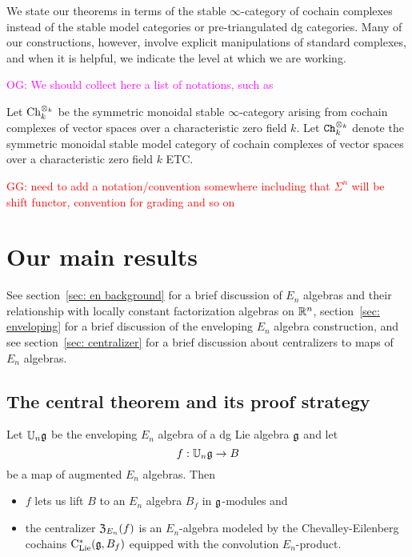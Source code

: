 \documentclass[11pt]{amsart}
\numberwithin{equation}{section}
\def\owen{\textcolor{magenta}{OG: }\textcolor{magenta}}
\def\greg{\textcolor{red}{GG: }\textcolor{red}}
\begin{document}
\begin{rmk}
We state our theorems in terms of the stable $\infty$-category of cochain complexes 
instead of the stable model categories or pre-triangulated dg categories. 
Many of our constructions, however, involve explicit manipulations of standard complexes, 
and when it is helpful, we indicate the level at which we are working.
\end{rmk}

\owen{We should collect here a list of notations, such as}

Let ${\rm Ch}_k^{\otimes_k}$ be the symmetric monoidal stable $\infty$-category arising from cochain complexes of vector spaces over a characteristic zero field $k$.
Let ${\tt Ch}_k^{\otimes_k}$ denote the symmetric monoidal stable model category of cochain complexes of vector spaces over a characteristic zero field $k$ ETC.

\greg{need to add a notation/convention somewhere including that $\Sigma^n$ will be shift functor, convention for grading and so on}

\section{Our main results}

See section~\ref{sec: en background} for a brief discussion of $E_n$ algebras and their relationship with locally constant factorization algebras on $\mathbb R^n$, section~\ref{sec: enveloping} for a brief discussion of the enveloping $E_n$ algebra construction, and see section~\ref{sec: centralizer} 
for a brief discussion about centralizers to maps of $E_n$ algebras.

\subsection{The central theorem and its proof strategy}


\begin{thm}
\label{thm: centralizer}
Let $\mathbb U_n \mathfrak g$ be the enveloping $E_n$ algebra of a dg Lie algebra $\mathfrak g$ and let 
\[
f: \mathbb U_n \mathfrak g \to B
\]
be a map of augmented $E_n$ algebras.
Then
\begin{itemize}
\item $f$ lets us lift $B$ to an $E_n$ algebra $B_f$ in $\mathfrak g$-modules and
\item the centralizer ${\frak Z}_{E_n}(f)$ is an $E_n$-algebra modeled by the Chevalley-Eilenberg 
cochains ${\rm C}_{\rm Lie}^*(\mathfrak g, B_f)$ equipped with the convolution $E_n$-product.
\end{itemize}
\end{thm}
\end{document}
